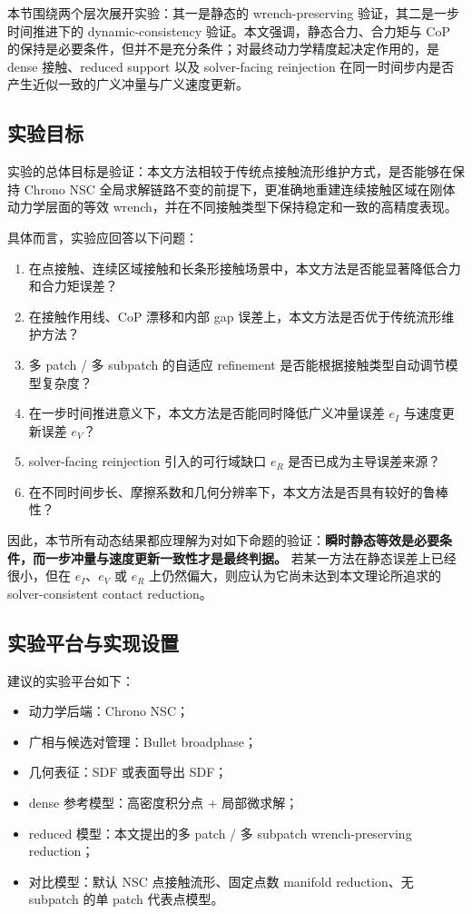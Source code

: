 \label{sec:experiments}

本节围绕两个层次展开实验：其一是静态的 wrench-preserving 验证，其二是一步时间推进下的 dynamic-consistency 验证。本文强调，静态合力、合力矩与 CoP 的保持是必要条件，但并不是充分条件；对最终动力学精度起决定作用的，是 dense 接触、reduced support 以及 solver-facing reinjection 在同一时间步内是否产生近似一致的广义冲量与广义速度更新。

\subsection{实验目标}

实验的总体目标是验证：本文方法相较于传统点接触流形维护方式，是否能够在保持 Chrono NSC 全局求解链路不变的前提下，更准确地重建连续接触区域在刚体动力学层面的等效 wrench，并在不同接触类型下保持稳定和一致的高精度表现。

具体而言，实验应回答以下问题：
\begin{enumerate}[label=(\arabic*)]
    \item 在点接触、连续区域接触和长条形接触场景中，本文方法是否能显著降低合力和合力矩误差？
    \item 在接触作用线、CoP 漂移和内部 gap 误差上，本文方法是否优于传统流形维护方法？
    \item 多 patch / 多 subpatch 的自适应 refinement 是否能根据接触类型自动调节模型复杂度？
    \item 在一步时间推进意义下，本文方法是否能同时降低广义冲量误差 $e_I$ 与速度更新误差 $e_V$？
    \item solver-facing reinjection 引入的可行域缺口 $e_R$ 是否已成为主导误差来源？
    \item 在不同时间步长、摩擦系数和几何分辨率下，本文方法是否具有较好的鲁棒性？
\end{enumerate}

因此，本节所有动态结果都应理解为对如下命题的验证：\textbf{瞬时静态等效是必要条件，而一步冲量与速度更新一致性才是最终判据。} 若某一方法在静态误差上已经很小，但在 $e_I$、$e_V$ 或 $e_R$ 上仍然偏大，则应认为它尚未达到本文理论所追求的 solver-consistent contact reduction。

\subsection{实验平台与实现设置}

建议的实验平台如下：
\begin{itemize}[leftmargin=2em]
    \item 动力学后端：Chrono NSC；
    \item 广相与候选对管理：Bullet broadphase；
    \item 几何表征：SDF 或表面导出 SDF；
    \item dense 参考模型：高密度积分点 + 局部微求解；
    \item reduced 模型：本文提出的多 patch / 多 subpatch wrench-preserving reduction；
    \item 对比模型：默认 NSC 点接触流形、固定点数 manifold reduction、无 subpatch 的单 patch 代表点模型。
\end{itemize}

